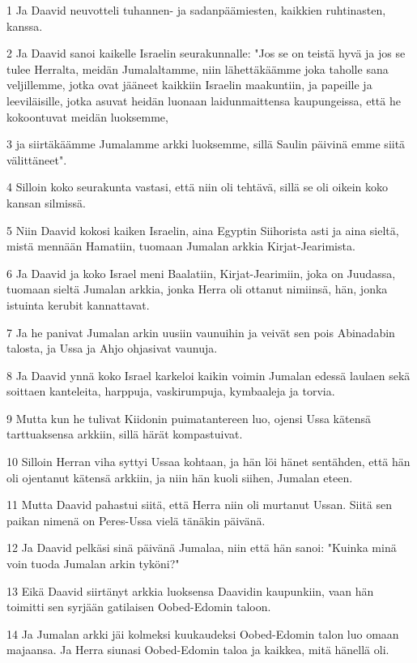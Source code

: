 \par 1 Ja Daavid neuvotteli tuhannen- ja sadanpäämiesten, kaikkien ruhtinasten, kanssa.
\par 2 Ja Daavid sanoi kaikelle Israelin seurakunnalle: "Jos se on teistä hyvä ja jos se tulee Herralta, meidän Jumalaltamme, niin lähettäkäämme joka taholle sana veljillemme, jotka ovat jääneet kaikkiin Israelin maakuntiin, ja papeille ja leeviläisille, jotka asuvat heidän luonaan laidunmaittensa kaupungeissa, että he kokoontuvat meidän luoksemme,
\par 3 ja siirtäkäämme Jumalamme arkki luoksemme, sillä Saulin päivinä emme siitä välittäneet".
\par 4 Silloin koko seurakunta vastasi, että niin oli tehtävä, sillä se oli oikein koko kansan silmissä.
\par 5 Niin Daavid kokosi kaiken Israelin, aina Egyptin Siihorista asti ja aina sieltä, mistä mennään Hamatiin, tuomaan Jumalan arkkia Kirjat-Jearimista.
\par 6 Ja Daavid ja koko Israel meni Baalatiin, Kirjat-Jearimiin, joka on Juudassa, tuomaan sieltä Jumalan arkkia, jonka Herra oli ottanut nimiinsä, hän, jonka istuinta kerubit kannattavat.
\par 7 Ja he panivat Jumalan arkin uusiin vaunuihin ja veivät sen pois Abinadabin talosta, ja Ussa ja Ahjo ohjasivat vaunuja.
\par 8 Ja Daavid ynnä koko Israel karkeloi kaikin voimin Jumalan edessä laulaen sekä soittaen kanteleita, harppuja, vaskirumpuja, kymbaaleja ja torvia.
\par 9 Mutta kun he tulivat Kiidonin puimatantereen luo, ojensi Ussa kätensä tarttuaksensa arkkiin, sillä härät kompastuivat.
\par 10 Silloin Herran viha syttyi Ussaa kohtaan, ja hän löi hänet sentähden, että hän oli ojentanut kätensä arkkiin, ja niin hän kuoli siihen, Jumalan eteen.
\par 11 Mutta Daavid pahastui siitä, että Herra niin oli murtanut Ussan. Siitä sen paikan nimenä on Peres-Ussa vielä tänäkin päivänä.
\par 12 Ja Daavid pelkäsi sinä päivänä Jumalaa, niin että hän sanoi: "Kuinka minä voin tuoda Jumalan arkin tyköni?"
\par 13 Eikä Daavid siirtänyt arkkia luoksensa Daavidin kaupunkiin, vaan hän toimitti sen syrjään gatilaisen Oobed-Edomin taloon.
\par 14 Ja Jumalan arkki jäi kolmeksi kuukaudeksi Oobed-Edomin talon luo omaan majaansa. Ja Herra siunasi Oobed-Edomin taloa ja kaikkea, mitä hänellä oli.

